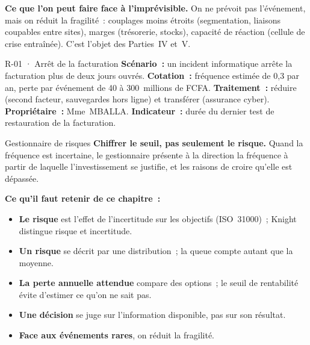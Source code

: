 \begin{boxinfo}
\textbf{Ce que l'on peut faire face à l'imprévisible.} On ne prévoit pas
l'événement, mais on réduit la fragilité~: couplages moins étroits
(segmentation, liaisons coupables entre sites), marges (trésorerie,
stocks), capacité de réaction (cellule de crise entraînée). C'est l'objet
des Parties~IV et~V.
\end{boxinfo}

\begin{boxobjet}{R-01 · Arrêt de la facturation}
\textbf{Scénario~:} un incident informatique arrête la facturation plus
de deux jours ouvrés. \textbf{Cotation~:} fréquence estimée de 0,3 par an,
perte par événement de 40 à 300~millions de FCFA. \textbf{Traitement~:}
réduire (second facteur, sauvegardes hors ligne) et transférer (assurance
cyber). \textbf{Propriétaire~:} Mme~MBALLA. \textbf{Indicateur~:} durée du
dernier test de restauration de la facturation.
\end{boxobjet}

\begin{boxmetier}{Gestionnaire de risques}
\textbf{Chiffrer le seuil, pas seulement le risque.} Quand la fréquence
est incertaine, le gestionnaire présente à la direction la fréquence à
partir de laquelle l'investissement se justifie, et les raisons de croire
qu'elle est dépassée.
\end{boxmetier}

\separateur

\begin{boxresume}
\textbf{Ce qu'il faut retenir de ce chapitre~:}
\begin{itemize}
    \item \textbf{Le risque} est l'effet de l'incertitude sur les
          objectifs (ISO~31000)~; Knight distingue risque et incertitude.
    \item \textbf{Un risque} se décrit par une distribution~; la queue
          compte autant que la moyenne.
    \item \textbf{La perte annuelle attendue} compare des options~; le
          seuil de rentabilité évite d'estimer ce qu'on ne sait pas.
    \item \textbf{Une décision} se juge sur l'information disponible, pas
          sur son résultat.
    \item \textbf{Face aux événements rares}, on réduit la fragilité.
\end{itemize}
\end{boxresume}

